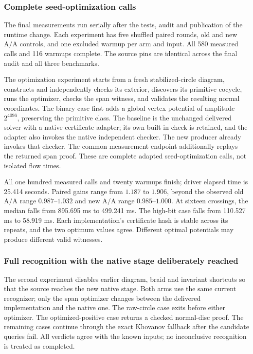 \subsubsection{Complete seed-optimization calls}

The final measurements run serially after the tests, audit and publication
of the runtime change. Each experiment has five shuffled paired rounds,
old and new A/A controls, and one excluded warmup per arm and input. All
580 measured calls and 116 warmups complete. The source pins are identical
across the final audit and all three benchmarks.

The optimization experiment starts from a fresh stabilized-circle diagram,
constructs and independently checks its exterior, discovers its primitive
cocycle, runs the optimizer, checks the span witness, and validates the
resulting normal coordinates. The binary case first adds a global vertex
potential of amplitude $2^{4096}$, preserving the primitive class. The
baseline is the unchanged delivered solver with a native certificate adapter;
its own built-in check is retained, and the adapter also invokes the native
independent checker. The new producer already invokes that checker. The
common measurement endpoint additionally replays the returned span proof.
These are complete adapted seed-optimization calls, not isolated flow times.

\begin{center}
\small

\end{center}

All one hundred measured calls and twenty warmups finish; driver elapsed
time is 25.414 seconds. Paired gains range from $1.187$ to $1.906$, beyond
the observed old A/A range $0.987$--$1.032$ and new A/A range
$0.985$--$1.000$. At sixteen crossings, the median falls from 895.695 ms
to 499.241 ms. The high-bit case falls from 110.527 ms to 58.919 ms.
Each implementation's certificate hash is stable across its repeats, and
the two optimum values agree. Different optimal potentials may produce
different valid witnesses.

\subsubsection{Full recognition with the native stage deliberately reached}

The second experiment disables earlier diagram, braid and invariant
shortcuts so that the source reaches the new native stage. Both arms use
the same current recognizer; only the span optimizer changes between the
delivered implementation and the native one. The raw-circle case exits
before either optimizer. The optimized-positive case returns a checked
normal-disc proof. The remaining cases continue through the exact
Khovanov fallback after the candidate queries fail. All verdicts agree with
the known inputs; no inconclusive recognition is treated as completed.


